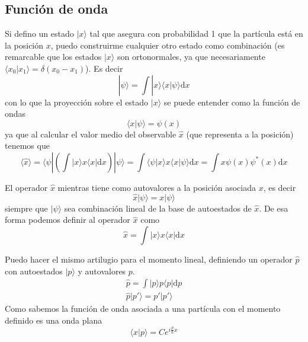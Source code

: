\subsection{Función de onda}
Si defino un estado $|x\rangle$ tal que asegura con probabilidad 1 que la partícula está en la posición $x$, puedo construirme cualquier otro estado como combinación (es remarcable que los estados $|x\rangle$ son ortonormales, ya que necesariamente $\langle x_0 | x_1 \rangle = \delta(x_0 - x_1)$).
Es decir
\begin{equation}
    |\psi \rangle = \int |x \rangle \langle x | \psi \rangle \mathrm{d}x
\end{equation}
con lo que la proyección sobre el estado $|x\rangle$ se puede entender como la función de ondas
\begin{equation}
  \langle x|\psi\rangle = \psi(x) 
\end{equation}
ya que al calcular el valor medio del observable $\hat{x}$ (que representa a la posición) tenemos que
\begin{equation}
    \langle \hat{x} \rangle = \langle \psi | \left( \int |x \rangle x \langle x | \mathrm{d}x \right) | \psi \rangle = \int \langle \psi | x \rangle x \langle x | \psi \rangle \mathrm{d} x = \int x \psi(x) \psi^*(x) \mathrm{d}x
\end{equation}

El operador $\hat{x}$ mientras tiene como autovalores a la posición asociada $x$, es decir
\begin{equation}
    \hat{x} |\psi\rangle = x |\psi\rangle
\end{equation}
siempre que $|\psi\rangle$ sea combinación lineal de la base de autoestados de $\hat{x}$.
De esa forma podemos definir al operador $\hat{x}$ como 
\begin{equation}
\hat{x} = \int |x\rangle x \langle x | \mathrm{d}x
\label{eq:operador_x}
\end{equation}

Puedo hacer el mismo artilugio para el momento lineal, definiendo un operador $\hat{p}$ con autoestados $|p\rangle$ y autovalores $p$.
\begin{equation}
\begin{gathered}
\hat{p} = \int |p\rangle p \langle p | \mathrm{d}p\\
\hat{p} |p'\rangle = p' |p'\rangle
\end{gathered}
\end{equation}
Como sabemos la función de onda asociada a una partícula con el momento definido es una onda plana
\begin{equation}
\langle x | p \rangle = C e^{i \frac{p}{\hbar} x}
\end{equation}

